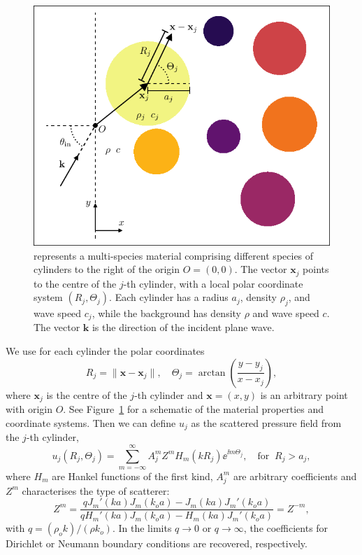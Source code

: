 \documentclass[ 12pt, a4paper]{article}
\begin{document}
\begin{figure}[t]
  \centering
  \includegraphics[width=0.72\linewidth]{multispecies.pdf}
  \caption{ represents a multi-species material comprising different species of cylinders to the right of the origin $O = (0,0)$. The vector $\mathbf x_j$ points to the centre of the $j$-th cylinder, with a local polar coordinate system $(R_j, \Theta_j)$. Each cylinder has a radius $a_j$, density $\rho_j$, and wave speed $c_j$, while the background has density $\rho$ and wave speed $c$. The vector $\mathbf k$ is the direction of the incident plane wave.  }
  \label{fig:multispecies}
\end{figure}

We use for each cylinder the polar coordinates
\begin{equation} 
R_{j} =\| \mathbf x- \mathbf x_{j} \|, \quad \Theta_{j} = \arctan \left( \frac{y-y_{j}}{x- x_{j}} \right),
\label{eqns:polar_coords}
\end{equation} 
where $\mathbf x_j$ is the centre of the $j$-th cylinder and $\mathbf x = (x,y)$ is an arbitrary point with origin $O$. See Figure~\ref{fig:multispecies} for a schematic of the material properties and coordinate systems.
Then we can define $u_j$ as the scattered pressure field from the $j$-th cylinder,
\begin{equation}  \label{eqn:outwaves}
	u_j(R_j,\Theta_j) = \sum_{m=-\infty}^\infty A_j^m Z^m H_m(k R_j) \ee^{\ii m \Theta_j}, \quad \text{for} \;\; R_j > a_j,
\end{equation} 
where $H_m$ are Hankel functions of the first kind, $A_j^m$ are arbitrary coefficients and $Z^m$ characterises the type of scatterer:
\begin{equation} 
Z^m = \frac{q J_m' (k a) J_m ({k_o} a) - J_m (k a) J_m' ({k_o} a) }{q H_m '(k a) J_m({k_o} a) - H_m(k a) J_m '({k_o} a)} = Z^{-m},
\label{eqn:Zm}
\end{equation} 
with ${q} = (\rho_o k)/(\rho k_o)$. In the limits ${q} \to 0$ or ${q} \to \infty$, the coefficients for Dirichlet or Neumann boundary conditions are recovered, respectively.
\end{document}
